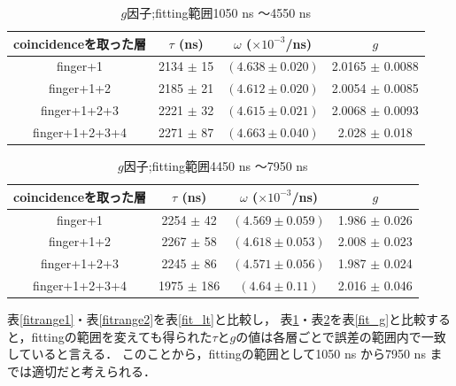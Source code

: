   \begin{table}[H]
    \caption{$g$因子;fitting範囲1050 ns 〜4550 ns }
    \label{fitrange3}
    \begin{center}
     \begin{tabular}{cccc}\toprule
      coincidenceを取った層&$\tau$ (ns)& $\omega$ ($\times 10^{-3}$/ns) & $g$ \\ \midrule
      finger+1             &2134 $\pm$ 15 & $( 4.638 \pm 0.020 ) $ & 2.0165 $\pm$ 0.0088 \\
      finger+1+2 	  &2185 $\pm$ 21 & $( 4.612 \pm 0.020 ) $ & 2.0054 $\pm$ 0.0085 \\
      finger+1+2+3 	  &2221 $\pm$ 32 & $( 4.615 \pm 0.021 ) $ & 2.0068 $\pm$ 0.0093\\
      finger+1+2+3+4 	  &2271 $\pm$ 87 & $( 4.663 \pm 0.040 ) $ & 2.028 $\pm$ 0.018 \\ \bottomrule
     \end{tabular}
    \end{center}    
  \end{table}%

  \begin{table}[H]
   \caption{$g$因子;fitting範囲4450 ns 〜7950 ns }
   \label{fitrange4}
   \begin{center}
    \begin{tabular}{cccc}\toprule
     coincidenceを取った層&$\tau$ (ns)& $\omega$ ($\times 10^{-3}$/ns) & $g$ \\ \midrule
     finger+1             &2254 $\pm$ 42 & $( 4.569 \pm 0.059 ) $ & 1.986 $\pm$ 0.026 \\
     finger+1+2 	  &2267 $\pm$ 58 & $( 4.618 \pm 0.053 ) $ & 2.008 $\pm$ 0.023 \\
     finger+1+2+3 	  &2245 $\pm$ 86 & $( 4.571 \pm 0.056 ) $ & 1.987 $\pm$ 0.024\\
     finger+1+2+3+4 	  &1975 $\pm$ 186& $( 4.64 \pm 0.11 ) $ & 2.016 $\pm$ 0.046 \\ \bottomrule
    \end{tabular}
   \end{center}
  \end{table}%

  表\ref{fitrange1}・表\ref{fitrange2}を表\ref{fit_lt}と比較し，
  表\ref{fitrange3}・表\ref{fitrange4}を表\ref{fit_g}と比較すると，fittingの範囲を変えても得られた$\tau$と$g$の値は各層ごとで誤差の範囲内で一致していると言える．
  このことから，fittingの範囲として1050 ns から7950 ns までは適切だと考えられる．


